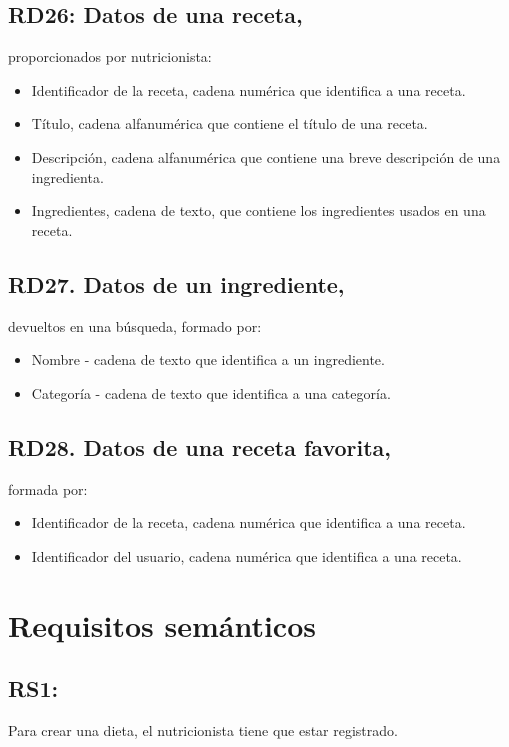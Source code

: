 \documentclass[12pt,letterpaper]{article}
\begin{document}
\subsection{RD26: Datos de una receta,} proporcionados por nutricionista:
\begin{itemize}
\item Identificador de la receta, cadena numérica que identifica a una receta.
\item Título, cadena alfanumérica que contiene el título de una receta.
\item Descripción, cadena alfanumérica que contiene una breve descripción de una ingredienta.
\item Ingredientes, cadena de texto, que contiene los ingredientes usados en una receta.

\end{itemize} 
\subsection{RD27. Datos de un ingrediente,} devueltos en una búsqueda, formado por:
\begin{itemize}
\item Nombre -  cadena de texto que identifica a un ingrediente.
\item Categoría - cadena de texto que identifica a una categoría.

\end{itemize} 
\subsection{RD28. Datos de una receta favorita,} formada por:
\begin{itemize}
\item Identificador de la receta, cadena numérica que identifica a una receta.
\item Identificador del usuario, cadena numérica que identifica a una receta.
\end{itemize}



\section{Requisitos semánticos}
\noindent
\subsection{RS1:} Para crear una dieta, el nutricionista tiene que estar registrado.\\
\end{document}
